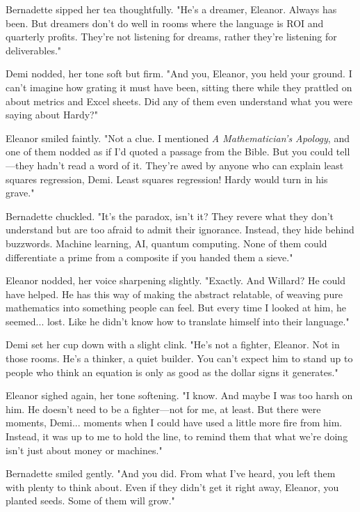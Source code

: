 Bernadette sipped her tea thoughtfully. "He’s a dreamer, Eleanor. Always has been. But dreamers don’t do well in rooms where the language is ROI and quarterly profits. They’re not listening for dreams, rather they’re listening for deliverables."
\smallskip

Demi nodded, her tone soft but firm. "And you, Eleanor, you held your ground. I can’t imagine how grating it must have been, sitting there while they prattled on about metrics and Excel sheets. Did any of them even understand what you were saying about Hardy?"
\smallskip

Eleanor smiled faintly. "Not a clue. I mentioned \textit{ A Mathematician’s Apology}, and one of them nodded as if I’d quoted a passage from the Bible. But you could tell—they hadn’t read a word of it. They’re awed by anyone who can explain least squares regression, Demi. Least squares regression! Hardy would turn in his grave."
\smallskip

Bernadette chuckled. "It’s the paradox, isn’t it? They revere what they don’t understand but are too afraid to admit their ignorance. Instead, they hide behind buzzwords. Machine learning, AI, quantum computing. None of them could differentiate a prime from a composite if you handed them a sieve."
\smallskip

Eleanor nodded, her voice sharpening slightly. "Exactly. And Willard? He could have helped. He has this way of making the abstract relatable, of weaving pure mathematics into something people can feel. But every time I looked at him, he seemed... lost. Like he didn’t know how to translate himself into their language."
\smallskip

Demi set her cup down with a slight clink. "He’s not a fighter, Eleanor. Not in those rooms. He’s a thinker, a quiet builder. You can’t expect him to stand up to people who think an equation is only as good as the dollar signs it generates."
\smallskip

Eleanor sighed again, her tone softening. "I know. And maybe I was too harsh on him. He doesn’t need to be a fighter—not for me, at least. But there were moments, Demi... moments when I could have used a little more fire from him. Instead, it was up to me to hold the line, to remind them that what we’re doing isn’t just about money or machines."
\smallskip

Bernadette smiled gently. "And you did. From what I’ve heard, you left them with plenty to think about. Even if they didn’t get it right away, Eleanor, you planted seeds. Some of them will grow."
\smallskip

